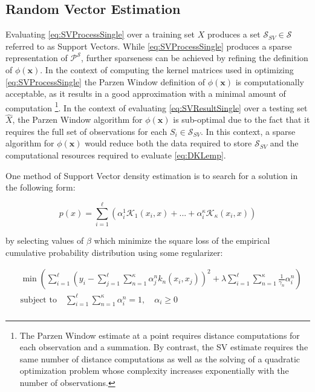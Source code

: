 \documentclass[10pt]{article}
\begin{document}
\subsection{ Random Vector Estimation }
 
Evaluating \ref{eq:SVProcessSingle} over a training set \( X \) produces a set \( \mathcal{S}_{SV} \in \mathcal{S} \) referred to as Support Vectors.  While \ref{eq:SVProcessSingle} produces a sparse representation of \( \mathcal{P}^\mathcal{S} \), further sparseness can be achieved by refining the definition of \( \phi(\mathbf{x}) \).  In the context of computing the kernel matrices used in optimizing \ref{eq:SVProcessSingle} the Parzen Window definition of \( \phi(\mathbf{x}) \) is computationally acceptable, as it results in a good approximation with a minimal amount of computation \footnote{ The Parzen Window estimate at a point requires distance computations for each observation and a summation.  By contrast, the SV estimate requires the same number of distance computations as well as the solving of a quadratic optimization problem whose complexity increases exponentially with the number of observations. }.  In the context of evaluating \ref{eq:SVResultSingle} over a testing set \( \hat{X} \), the Parzen Window algorithm for \( \phi(\mathbf{x}) \) is sub-optimal due to the fact that it requires the full set of observations for each \( S_i \in \mathcal{S}_{SV} \).  In this context, a sparse algorithm for \( \phi(\mathbf{x}) \) would reduce both the data required to store \( \mathcal{S}_{SV} \) and the computational resources required to evaluate \ref{eq:DKLemp}.

One method of Support Vector density estimation is to search for a solution in the following form:

\begin{equation} \label{eq:SVDensity}
p(x) = \sum_{i=1}^\ell \left( \alpha_i^1 \mathcal{K}_1(x_i,x) + ... + \alpha_i^\kappa \mathcal{K}_\kappa( x_i,x) \right)
\end{equation}

by selecting values of \( \beta \) which minimize the square loss of the empirical cumulative probability distribution using some regularizer:

\begin{align}
&\min \left( \sum_{i=1}^\ell \left( y_i - \sum_{j=1}^\ell \sum_{n=1}^\kappa \alpha_j^n k_n(x_i, x_j) \right)^2 + \lambda \sum_{i=1}^\ell \sum_{n=1}^\kappa \frac{1}{\gamma_n} \alpha_i^n \right) \\
&\text{subject to} \quad \sum_{i=1}^\ell \sum_{n=1}^\kappa \alpha_i^n = 1, \quad \alpha_i \ge 0 \\
\end{align}
\end{document}
